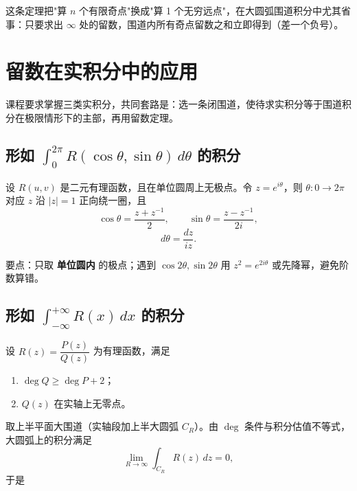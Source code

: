 
这条定理把"算 \(n\) 个有限奇点"换成"算 1 个无穷远点"，在大圆弧围道积分中尤其省事：只要求出 \(\infty\) 处的留数，围道内所有奇点留数之和立即得到（差一个负号）。


\section{留数在实积分中的应用}

课程要求掌握三类实积分，共同套路是：选一条闭围道，使待求实积分等于围道积分在极限情形下的主部，再用留数定理。

\subsection{形如 \(\int_0^{2\pi}R(\cos\theta,\sin\theta)\,d\theta\) 的积分}

设 \(R(u,v)\) 是二元有理函数，且在单位圆周上无极点。令 \(z=e^{i\theta}\)，则 \(\theta:0\to2\pi\) 对应 \(z\) 沿 \(|z|=1\) 正向绕一圈，且
\[
\cos\theta=\frac{z+z^{-1}}{2},\qquad
\sin\theta=\frac{z-z^{-1}}{2i},
\]
\[
d\theta=\frac{dz}{iz}.
\]


要点：只取 \textbf{单位圆内} 的极点；遇到 \(\cos2\theta,\sin2\theta\) 用 \(z^2=e^{2i\theta}\) 或先降幂，避免阶数算错。

\subsection{形如 \(\int_{-\infty}^{+\infty}R(x)\,dx\) 的积分}

设 \(R(z)=\dfrac{P(z)}{Q(z)}\) 为有理函数，满足
\begin{enumerate}[label=(\arabic*)]
    \item \(\deg Q\ge \deg P+2\)；
    \item \(Q(z)\) 在实轴上无零点。
\end{enumerate}
取上半平面大围道（实轴段加上半大圆弧 \(C_R\)）。由 \(\deg\) 条件与积分估值不等式，大圆弧上的积分满足
\[
\lim_{R\to\infty}\int_{C_R}R(z)\,dz=0,
\]
于是

